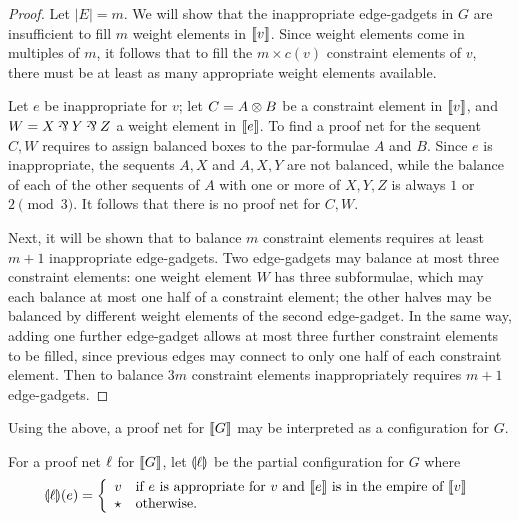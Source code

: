 \documentclass{lmcs}
\begin{document}
\begin{proof}
%
Let $|E|=m$.
%
We will show that the inappropriate edge-gadgets in $G$ are insufficient to fill $m$ weight elements in $\llbracket v\rrbracket$.
%
Since weight elements come in multiples of $m$, it follows that to fill the $m\times c(v)$ constraint elements of $v$, there must be at least as many appropriate weight elements available.



Let $e$ be inappropriate for $v$; let $C=A\otimes B$ be a constraint element in $\llbracket v\rrbracket$, and $W=X\pr Y\pr Z$ a weight element  in $\llbracket e\rrbracket$. To find a proof net for the sequent $C,W$ requires to assign balanced boxes to the par-formulae $A$ and $B$. Since $e$ is inappropriate, the sequents $A,X$ and $A,X,Y$ are not balanced, while the balance of each of the other sequents of $A$ with one or more of $X,Y,Z$ is always $1$ or $2\pmod 3$. It follows that there is no proof net for $C,W$.


Next, it will be shown that to balance $m$ constraint elements requires at least $m+1$ inappropriate edge-gadgets.
%
Two edge-gadgets may balance at most three constraint elements: one weight element $W$ has three subformulae, which may each balance at most one half of a constraint element; the other halves may be balanced by different weight elements of the second edge-gadget.
%
In the same way, adding one further edge-gadget allows at most three further constraint elements to be filled, since previous edges may connect to only one half of each constraint element.
%
Then to balance $3m$ constraint elements inappropriately requires $m+1$ edge-gadgets.

\end{proof}



Using the above, a proof net for $\llbracket G\rrbracket$ may be interpreted as a configuration for $G$.



\begin{definition}
For a proof net $\ell$ for $\llbracket G\rrbracket$, let $\llparenthesis\ell\rrparenthesis$ be the partial configuration for $G$ where
\[
	\llparenthesis\ell\rrparenthesis(e)=
	\left\{\begin{array}{ll}
		v & \text{if $e$ is appropriate for $v$ and $\llbracket e\rrbracket$ is in the empire of $\llbracket v\rrbracket$} \\
		\star & \text{otherwise.}
	\end{array}\right.
\]
\end{definition}
\end{document}
